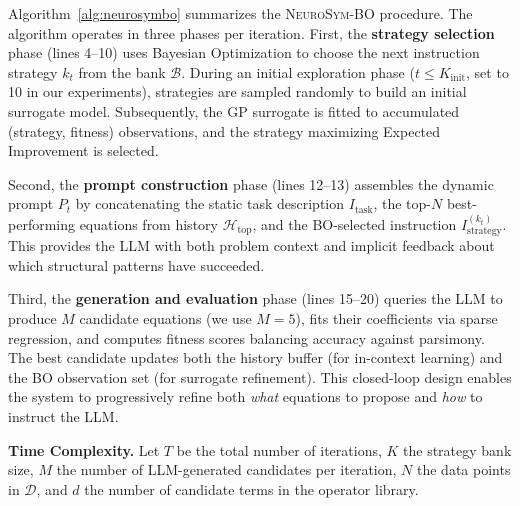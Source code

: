 Algorithm~\ref{alg:neurosymbo} summarizes the \textsc{NeuroSym-BO} procedure. 
The algorithm operates in three phases per iteration. First, the \textbf{strategy selection} phase (lines 4--10) uses Bayesian Optimization to choose the next instruction strategy $k_t$ from the bank $\mathcal{B}$. During an initial exploration phase ($t \leq K_{\text{init}}$, set to 10 in our experiments), strategies are sampled randomly to build an initial surrogate model. Subsequently, the GP surrogate is fitted to accumulated (strategy, fitness) observations, and the strategy maximizing Expected Improvement is selected.

Second, the \textbf{prompt construction} phase (lines 12--13) assembles the dynamic prompt $P_t$ by concatenating the static task description $I_{\text{task}}$, the top-$N$ best-performing equations from history $\mathcal{H}_{\text{top}}$, and the BO-selected instruction $I_{\text{strategy}}^{(k_t)}$. This provides the LLM with both problem context and implicit feedback about which structural patterns have succeeded.

Third, the \textbf{generation and evaluation} phase (lines 15--20) queries the LLM to produce $M$ candidate equations (we use $M=5$), fits their coefficients via sparse regression, and computes fitness scores balancing accuracy against parsimony. The best candidate updates both the history buffer (for in-context learning) and the BO observation set (for surrogate refinement). This closed-loop design enables the system to progressively refine both \textit{what} equations to propose and \textit{how} to instruct the LLM.

\textbf{Time Complexity.} Let $T$ be the total number of iterations, $K$ the strategy bank size, $M$ the number of LLM-generated candidates per iteration, $N$ the data points in $\mathcal{D}$, and $d$ the number of candidate terms in the operator library.

